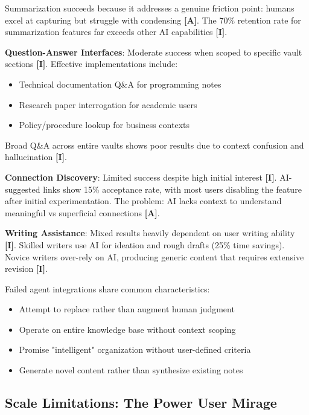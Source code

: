 \documentclass[a4paper,11pt]{article}
\newcommand{\ilabel}{\textbf{\textcolor{icolor}{[I]}}}
\newcommand{\alabel}{\textbf{\textcolor{acolor}{[A]}}}
\begin{document}
Summarization succeeds because it addresses a genuine friction point: humans excel at capturing but struggle with condensing \alabel{}. The 70\% retention rate for summarization features far exceeds other AI capabilities \ilabel{}.


\textbf{Question-Answer Interfaces}: Moderate success when scoped to specific vault sections \ilabel{}. Effective implementations include:

\begin{itemize}
  \item Technical documentation Q\&A for programming notes
  \item Research paper interrogation for academic users
  \item Policy/procedure lookup for business contexts
\end{itemize}

Broad Q\&A across entire vaults shows poor results due to context confusion and hallucination \ilabel{}.


\textbf{Connection Discovery}: Limited success despite high initial interest \ilabel{}. AI-suggested links show 15\% acceptance rate, with most users disabling the feature after initial experimentation. The problem: AI lacks context to understand meaningful vs superficial connections \alabel{}.


\textbf{Writing Assistance}: Mixed results heavily dependent on user writing ability \ilabel{}. Skilled writers use AI for ideation and rough drafts (25\% time savings). Novice writers over-rely on AI, producing generic content that requires extensive revision \ilabel{}.


Failed agent integrations share common characteristics:

\begin{itemize}
  \item Attempt to replace rather than augment human judgment
  \item Operate on entire knowledge base without context scoping
  \item Promise "intelligent" organization without user-defined criteria
  \item Generate novel content rather than synthesize existing notes
\end{itemize}

\subsection{Scale Limitations: The Power User Mirage}
\end{document}
